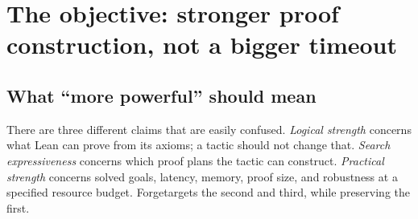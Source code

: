 \documentclass[11pt,letterpaper]{article}
\newcommand{\code}[1]{\texttt{#1}}
\newcommand{\Forge}{\textsf{Forge}}
\theoremstyle{definition}\newtheorem{definition}[theorem]{Definition}
\theoremstyle{remark}\newtheorem{remark}[theorem]{Remark}
\begin{document}
\begin{abstract}
A substantially more capable automatic Lean tactic should expand the kinds of proof plans it can construct, not merely increase saturation limits. This article specifies \Forge: a kernel-oriented architecture above and alongside \code{grind}, with structural proof search, dependency-correct induction generalization, schema-driven auxiliary-lemma synthesis, scope-correct witness generation, and certificate-producing arithmetic and Boolean engines. We explain the concrete interfaces, scheduling policy, reconstruction obligations, failure modes, and implementation sequence. Four executable prototype families test the central mechanisms. Their outputs include explicit induction traces, exact rational polynomial identities, covering Bernstein trees, resolution proofs with checked difference-logic lemmas, and finite residue tables with a universal soundness argument. Deliberate failures, independent oracles, and certificate mutations are included. The evidence supports feasibility of these components, while leaving the claimed improvement in end-to-end Lean proof rate as a clearly specified experiment rather than an invented result.
\end{abstract}
\tableofcontents
\newpage

\section{The objective: stronger proof construction, not a bigger timeout}
\subsection{What ``more powerful'' should mean}
There are three different claims that are easily confused. \emph{Logical strength} concerns what Lean can prove from its axioms; a tactic should not change that. \emph{Search expressiveness} concerns which proof plans the tactic can construct. \emph{Practical strength} concerns solved goals, latency, memory, proof size, and robustness at a specified resource budget. \Forge targets the second and third, while preserving the first.
\end{document}
